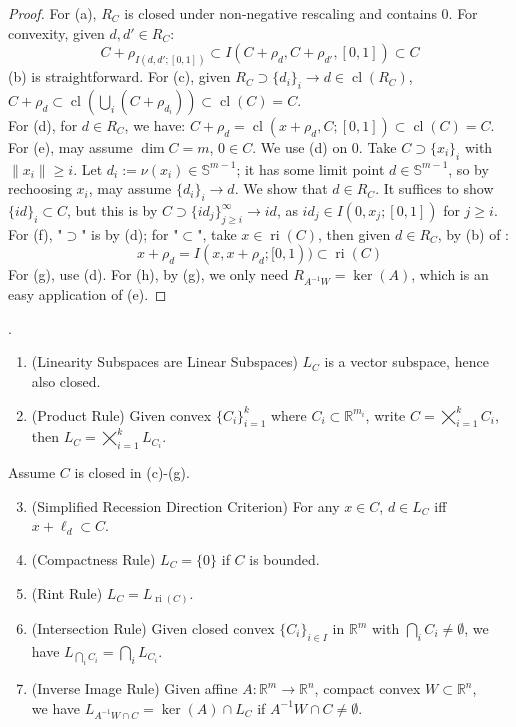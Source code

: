 \begin{proof}
	For (a), $R_C$ is closed under non-negative rescaling and contains $0$. For convexity, given $d,d'\in R_C$:
	\[
		C+\rho_{I(d,d';[0,1])}\subset I\left(C+\rho_{d},C+\rho_{d'},[0,1]\right)\subset C
	\]
	(b) is straightforward. For (c), given $R_C\supset \{d_i\}_i\to d\in \operatorname{cl}(R_C)$, $C+\rho_d\subset \operatorname{cl}\left(\bigcup_i\left(C+\rho_{d_i}\right)\right)\subset \operatorname{cl}(C)=C$.\\
	For (d), for $d\in R_C$, we have: $C+\rho_d=\operatorname{cl}\left(x+\rho_d,C;[0,1]\right)\subset \operatorname{cl}(C)=C$.\\
	For (e), may assume $\dim C=m$, $0\in C$. We use (d) on $0$. Take $C\supset \{x_i\}_i$ with $\|x_i\|\geq i$. Let $d_i:=\nu(x_i)\in \mathbb{S}^{m-1}$; it has some limit point $d\in \mathbb{S}^{m-1}$, so by rechoosing $x_i$, may assume $\{d_i\}_i\to d$. We show that $d\in R_C$. It suffices to show $\{id\}_i\subset C$, but this is by $C\supset\{id_j\}_{j\geq i}^\infty\to id$, as $id_j\in I(0,x_j;[0,1])$ for $j\geq i$.\\
	For (f), "$\supset$" is by (d); for "$\subset$", take $x\in \operatorname{ri}(C)$, then given $d\in R_C$, by (b) of :
	\[
		x+\rho_d = I(x,x+\rho_d;[0, 1))\subset \operatorname{ri}(C)
	\]
	For (g), use (d). For (h), by (g), we only need $R_{A^{-1}W}=\operatorname{ker}(A)$, which is an easy application of (e).
\end{proof}

\begin{prop}.
	\label{prop:013-yoga-linearity}
	\begin{enumerate}[label=(\alph*)]
		\item (Linearity Subspaces are Linear Subspaces) $L_C$ is a vector subspace, hence also closed.
		\item (Product Rule) Given convex $\{C_i\}_{i=1}^k$ where $C_i\subset \mathbb{R}^{m_i}$, write $C=\bigtimes_{i=1}^kC_i$, then $L_C=\bigtimes_{i=1}^kL_{C_i}$.
	\end{enumerate}
	Assume $C$ is closed in (c)-(g).
	\begin{enumerate}[label=(\alph*)]
		\setcounter{enumi}{2}
		\item (Simplified Recession Direction Criterion) For any $x\in C$, $d\in L_C$ iff $x+\ell_d\subset C$.
		\item (Compactness Rule) $L_C=\{0\}$ if $C$ is bounded.
		\item (Rint Rule) $L_C=L_{\operatorname{ri}(C)}$.
		\item (Intersection Rule) Given closed convex $\{C_i\}_{i\in I}$ in $\mathbb{R}^m$ with $\bigcap_i{C_i}\neq\emptyset$, we have $L_{\bigcap_iC_i}=\bigcap_iL_{C_i}$.
		\item (Inverse Image Rule) Given affine $A:\mathbb{R}^m\to \mathbb{R}^n$, compact convex $W\subset \mathbb{R}^n$,\\we have $L_{A^{-1}W\cap C}=\operatorname{ker}(A)\cap L_C$ if $A^{-1}W\cap C\neq\emptyset$.
	\end{enumerate}
\end{prop}

